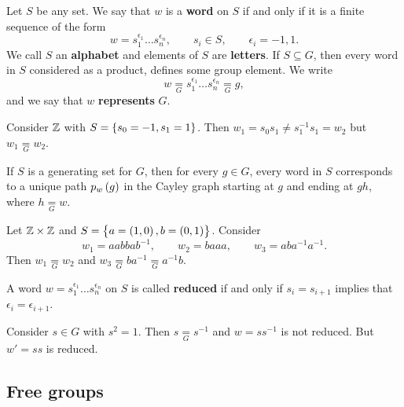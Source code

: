 \begin{definition}
Let $ S $ be any set. We say that $ w $ is a \textbf{word} on $ S $ if and only if it is a finite sequence of the form
$$ w = s_1^{\epsilon_1} \dots s_n^{\epsilon_n}, \qquad s_i \in S, \qquad \epsilon_i = -1, 1. $$
We call $ S $ an \textbf{alphabet} and elements of $ S $ are \textbf{letters}. If $ S \subseteq G $, then every word in $ S $ considered as a product, defines some group element. We write
$$ w \underset{G}{=} s_1^{\epsilon_1} \dots s_n^{\epsilon_n} \underset{G}{=} g, $$
and we say that $ w $ \textbf{represents} $ G $.
\end{definition}

\begin{example}
Consider $ \mathbb{Z} $ with $ S = \cbr{s_0 = -1, s_1 = 1} $. Then $ w_1 = s_0s_1 \ne s_1^{-1}s_1 = w_2 $ but $ w_1 \underset{G}{=} w_2 $.
\end{example}

\pagebreak

\begin{remark}
If $ S $ is a generating set for $ G $, then for every $ g \in G $, every word in $ S $ corresponds to a unique path $ p_w\br{g} $ in the Cayley graph starting at $ g $ and ending at $ gh $, where $ h \underset{G}{=} w $.
\end{remark}

\begin{example}
Let $ \mathbb{Z} \times \mathbb{Z} $ and $ S = \cbr{a = \br{1, 0}, b = \br{0, 1}} $. Consider
$$ w_1 = aabbab^{-1}, \qquad w_2 = baaa, \qquad w_3 = aba^{-1}a^{-1}. $$
Then $ w_1 \underset{G}{=} w_2 $ and $ w_3 \underset{G}{=} ba^{-1} \underset{G}{=} a^{-1}b $.
\end{example}

\begin{definition}
A word $ w = s_1^{\epsilon_1} \dots s_n^{\epsilon_n} $ on $ S $ is called \textbf{reduced} if and only if $ s_i = s_{i + 1} $ implies that $ \epsilon_i = \epsilon_{i + 1} $.
\end{definition}

Consider $ s \in G $ with $ s^2 = 1 $. Then $ s \underset{G}{=} s^{-1} $ and $ w = ss^{-1} $ is not reduced. But $ w' = ss $ is reduced.

\subsection{Free groups}


